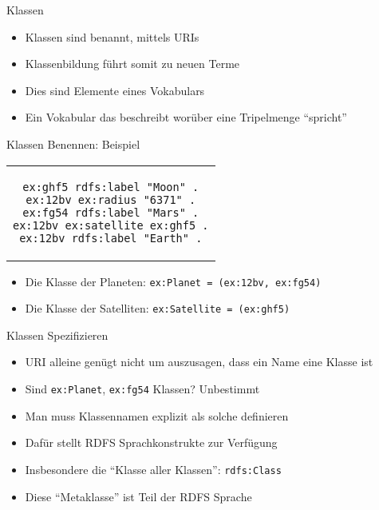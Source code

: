 \documentclass{beamer}
\begin{document}
\begin{frame}{Klassen}
	
	\begin{itemize}
		\item Klassen sind benannt, mittels URIs
		\item Klassenbildung führt somit zu neuen Terme
		\item Dies sind Elemente eines Vokabulars
		\item Ein Vokabular das beschreibt worüber eine Tripelmenge ``spricht''
	\end{itemize}
	
\end{frame}

\begin{frame}[fragile]{Klassen Benennen: Beispiel}
	
    \begin{center}
    	\begin{tabular}{c}
			\begin{lstlisting}
ex:ghf5 rdfs:label "Moon" .
ex:12bv ex:radius "6371" .
ex:fg54 rdfs:label "Mars" .
ex:12bv ex:satellite ex:ghf5 .
ex:12bv rdfs:label "Earth" .
			\end{lstlisting}
		\end{tabular}
	\end{center}
	
	\begin{itemize}
		\item Die Klasse der Planeten: \texttt{ex:Planet = (ex:12bv, ex:fg54)} 
		\item Die Klasse der Satelliten: \texttt{ex:Satellite = (ex:ghf5)}
	\end{itemize}
	
\end{frame}

\begin{frame}{Klassen Spezifizieren}
	
	\begin{itemize}
		\item URI alleine genügt nicht um auszusagen, dass ein Name eine Klasse ist
		\item Sind \texttt{ex:Planet}, \texttt{ex:fg54} Klassen? Unbestimmt
		\item Man muss Klassennamen explizit als solche definieren
		\item Dafür stellt RDFS Sprachkonstrukte zur Verfügung
		\item Insbesondere die ``Klasse aller Klassen'': \texttt{rdfs:Class}
		\item Diese ``Metaklasse'' ist Teil der RDFS Sprache
	\end{itemize}
	
\end{frame}
\end{document}
